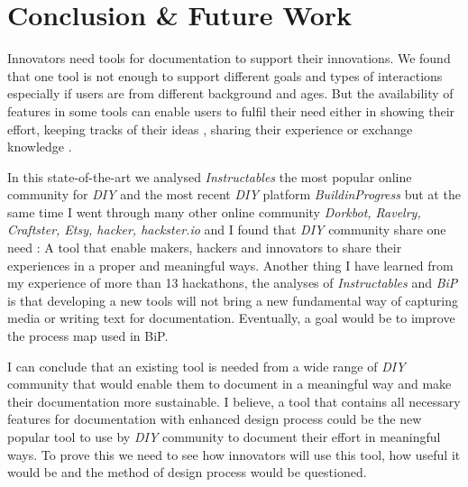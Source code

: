 \section{Conclusion \& Future Work}

Innovators need tools for documentation to support their innovations. We found that one tool is not enough to support different goals and types of interactions especially if users are from different background and ages. But the availability of features in some tools can enable users to fulfil their need either in showing their effort, keeping tracks of their ideas \cite{Wakkary:2015:TAH:2702123.2702550}, sharing their experience or exchange knowledge \cite{doi:10.1287/orsc.1070.0325}. 

In this state-of-the-art we analysed \textit{Instructables} the most popular online community for \textit{DIY} and the most recent \textit{DIY} platform \textit{BuildinProgress} but at the same time I went through many other online community \textit{Dorkbot, Ravelry, Craftster, Etsy, hacker, hackster.io} and I found that \textit{DIY} community share one need : A tool that enable makers, hackers and innovators to share their experiences in  a proper and meaningful ways.  Another thing I have learned from my experience of more than 13 hackathons, the analyses of \textit{Instructables}  and \textit{BiP} is that developing a new tools will not bring a new fundamental way of capturing media or writing text for documentation. Eventually, a goal would be to improve the process map used in BiP. 

I can conclude that an existing tool is needed from a wide range of \textit{DIY} community that would enable them to document in a meaningful way and make their documentation more sustainable. I believe, a tool that contains all necessary features for documentation with enhanced design process could be the new popular tool to use by \textit{DIY} community to document their effort in meaningful ways. To prove this we need to see how innovators will use this tool, how useful it would be and the method of design process would be questioned.